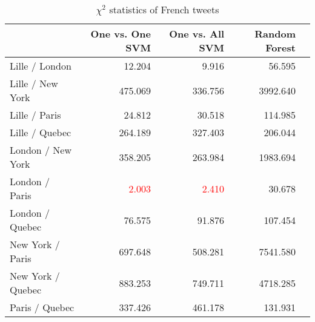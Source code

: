 \begin{table}[ht]
	\caption{$\chi^2$ statistics of French tweets}
	\begin{tabular}{|l|r|r|r|r|} \hline
	{}&One vs. One SVM &One vs. All SVM&Random Forest\\ \hline
	Lille / London & 12.204 & 9.916& 56.595 \\ \hline
	Lille / New York& 475.069  &  336.756  &  3992.640\\ \hline
	Lille / Paris & 24.812 & 30.518 & 114.985 \\ \hline
	Lille / Quebec & 264.189 & 327.403 & 206.044\\ \hline
	London / New York & 358.205 &  263.984  & 1983.694 \\ \hline
	London / Paris & \textcolor{red}{2.003} & \textcolor{red}{2.410} & 30.678 \\ \hline
	London / Quebec & 76.575  & 91.876 &  107.454 \\ \hline
	New York / Paris & 697.648  & 508.281  &  7541.580 \\ \hline
	New York / Quebec & 883.253  & 749.711  & 4718.285\\ \hline
	Paris / Quebec & 337.426  & 461.178 &131.931 \\ \hline
	\end{tabular}
	\label{tab:result_chi_fr}
\end{table}

